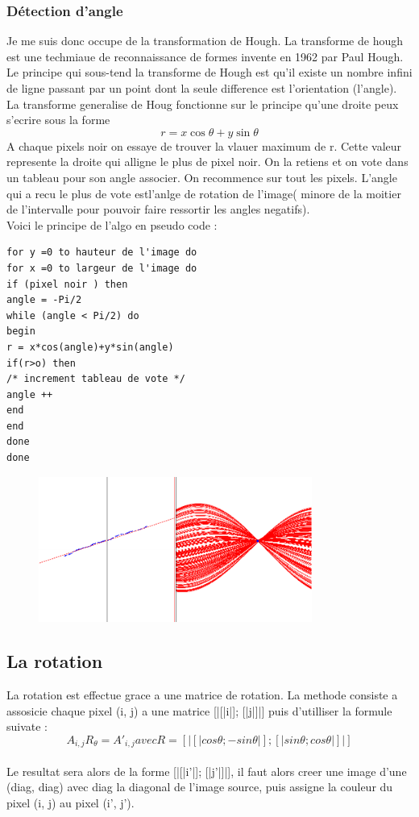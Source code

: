 \subsubsection{Détection d'angle}
Je me suis donc occupe de la transformation de Hough. La transforme de hough est une techmiaue de reconnaissance de formes invente en 1962 par Paul Hough.
Le principe qui sous-tend la transforme de Hough est qu'il existe un nombre infini de ligne passant par un point dont la seule difference est l'orientation (l'angle). La transforme generalise de Houg fonctionne sur le principe qu'une droite peux s'ecrire sous la forme
\[r = x\cos{\theta}+y\sin{\theta}\]
A chaque pixels noir on essaye de trouver la vlauer maximum de r. Cette valeur represente la droite qui alligne le plus de pixel noir. On la retiens et on vote dans un tableau pour son angle associer. On recommence sur tout les pixels. L'angle qui a recu le plus de vote estl'anlge de rotation de l'image( minore de la moitier de l'intervalle pour pouvoir faire ressortir les angles negatifs).
\\
\newpage
Voici le principe de l'algo en pseudo code :
\begin{lstlisting}
for y =0 to hauteur de l'image do
for x =0 to largeur de l'image do
if (pixel noir ) then
angle = -Pi/2
while (angle < Pi/2) do
begin
r = x*cos(angle)+y*sin(angle)
if(r>o) then
/* increment tableau de vote */
angle ++
end
end
done
done

\end{lstlisting}

\begin{figure}[h]
	\centering
	\includegraphics[width=0.80\textwidth]{hough.png}
\end{figure}
\newpage
\subsection{La rotation}
La rotation est effectue grace a une matrice de rotation. La methode consiste a assosicie chaque pixel (i, j) a une matrice [|[|i|]; [|j|]|] puis d'utilliser la formule suivate :
\\
\[A_{i,j}R_{\theta} = A'_{i,j} avec R = [|[|cos \theta; -sin \theta|]; [|sin \theta; cos \theta|]|] \]
\\
Le resultat sera alors de la forme [|[|i'|]; [|j'|]|], il faut alors creer une image d'une (diag, diag) avec diag la diagonal de l'image source, puis assigne la couleur du pixel (i, j) au pixel (i', j').
